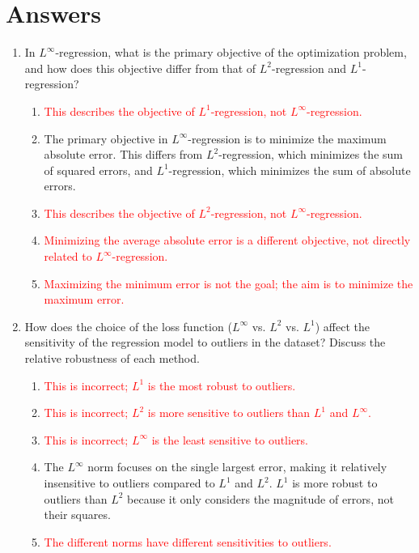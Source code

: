 \documentclass{article}%
\newcommand{\incorrect}[1]{\textcolor{red}{#1}}
\begin{document}
\section{Answers}%
\label{sec:Answers}%
\begin{enumerate}%
\item In $L^\infty$-regression, what is the primary objective of the optimization problem, and how does this objective differ from that of $L^2$-regression and $L^1$-regression?%
\begin{enumerate}%
\item \incorrect{This describes the objective of $L^1$-regression, not $L^\infty$-regression.}%
\item The primary objective in $L^\infty$-regression is to minimize the maximum absolute error. This differs from $L^2$-regression, which minimizes the sum of squared errors, and $L^1$-regression, which minimizes the sum of absolute errors.%
\item \incorrect{This describes the objective of $L^2$-regression, not $L^\infty$-regression.}%
\item \incorrect{Minimizing the average absolute error is a different objective, not directly related to $L^\infty$-regression.}%
\item \incorrect{Maximizing the minimum error is not the goal; the aim is to minimize the maximum error.}%
\end{enumerate}%
\vspace{1em}%
\item How does the choice of the loss function ($L^\infty$ vs. $L^2$ vs. $L^1$) affect the sensitivity of the regression model to outliers in the dataset?  Discuss the relative robustness of each method.%
\begin{enumerate}%
\item \incorrect{This is incorrect; $L^1$ is the most robust to outliers.}%
\item \incorrect{This is incorrect; $L^2$ is more sensitive to outliers than $L^1$ and $L^\infty$.}%
\item \incorrect{This is incorrect; $L^\infty$ is the least sensitive to outliers.}%
\item The $L^\infty$ norm focuses on the single largest error, making it relatively insensitive to outliers compared to $L^1$ and $L^2$. $L^1$ is more robust to outliers than $L^2$ because it only considers the magnitude of errors, not their squares.%
\item \incorrect{The different norms have different sensitivities to outliers.}%

\end{enumerate}
\end{enumerate}
\end{document}
